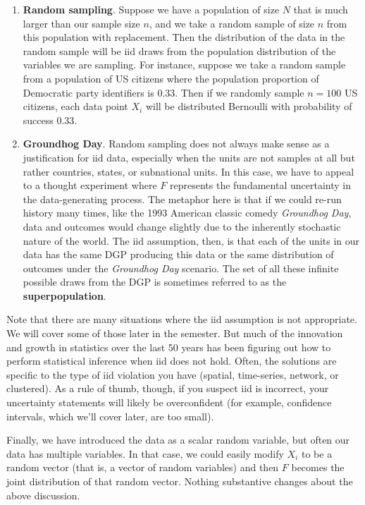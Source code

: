 \documentclass[
  letterpaper,
  DIV=11,
  numbers=noendperiod]{scrreprt}
\providecommand{\tightlist}{%
  \setlength{\itemsep}{0pt}\setlength{\parskip}{0pt}}\usepackage{longtable,booktabs,array}
\theoremstyle{definition}
\theoremstyle{plain}
\theoremstyle{definition}
\theoremstyle{remark}
\begin{document}
\begin{enumerate}
\def\labelenumi{\arabic{enumi}.}
\tightlist
\item
  \textbf{Random sampling}. Suppose we have a population of size \(N\)
  that is much larger than our sample size \(n\), and we take a random
  sample of size \(n\) from this population with replacement. Then the
  distribution of the data in the random sample will be iid draws from
  the population distribution of the variables we are sampling. For
  instance, suppose we take a random sample from a population of US
  citizens where the population proportion of Democratic party
  identifiers is 0.33. Then if we randomly sample \(n = 100\) US
  citizens, each data point \(X_i\) will be distributed Bernoulli with
  probability of success 0.33.
\item
  \textbf{Groundhog Day}. Random sampling does not always make sense as
  a justification for iid data, especially when the units are not
  samples at all but rather countries, states, or subnational units. In
  this case, we have to appeal to a thought experiment where \(F\)
  represents the fundamental uncertainty in the data-generating process.
  The metaphor here is that if we could re-run history many times, like
  the 1993 American classic comedy \emph{Groundhog Day}, data and
  outcomes would change slightly due to the inherently stochastic nature
  of the world. The iid assumption, then, is that each of the units in
  our data has the same DGP producing this data or the same distribution
  of outcomes under the \emph{Groundhog Day} scenario. The set of all
  these infinite possible draws from the DGP is sometimes referred to as
  the \textbf{superpopulation}.
\end{enumerate}

Note that there are many situations where the iid assumption is not
appropriate. We will cover some of those later in the semester. But much
of the innovation and growth in statistics over the last 50 years has
been figuring out how to perform statistical inference when iid does not
hold. Often, the solutions are specific to the type of iid violation you
have (spatial, time-series, network, or clustered). As a rule of thumb,
though, if you suspect iid is incorrect, your uncertainty statements
will likely be overconfident (for example, confidence intervals, which
we'll cover later, are too small).

Finally, we have introduced the data as a scalar random variable, but
often our data has multiple variables. In that case, we could easily
modify \(X_i\) to be a random vector (that is, a vector of random
variables) and then \(F\) becomes the joint distribution of that random
vector. Nothing substantive changes about the above discussion.
\end{document}
